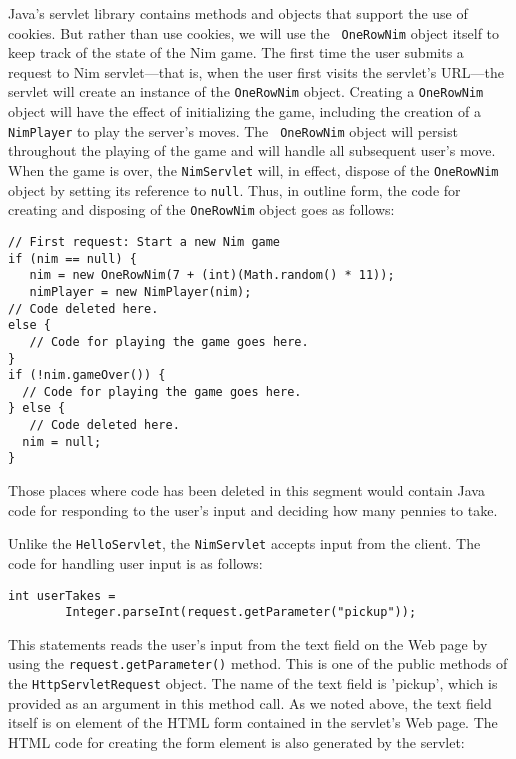 Java's servlet library contains methods and objects that support the
use of cookies. But rather than use cookies, we will use the {\tt
OneRowNim} object itself to keep track of the state of the Nim game.
The first time the user submits a request to Nim servlet---that is,
when the user first visits the servlet's URL---the servlet will create
an instance of the {\tt OneRowNim} object. Creating a {\tt OneRowNim}
object will have the effect of initializing the game, including the
creation of a {\tt NimPlayer} to play the server's moves.  The {\tt
OneRowNim} object will persist throughout the playing of the game and
will handle all subsequent user's move. When the game is over, the
{\tt NimServlet} will, in effect, dispose of the {\tt OneRowNim}
object by setting its reference to {\tt null}.  Thus, in outline
form, the code for creating and disposing of the {\tt OneRowNim}
object goes as follows:

\begin{jjjlisting}
\begin{lstlisting}
// First request: Start a new Nim game
if (nim == null) { 
   nim = new OneRowNim(7 + (int)(Math.random() * 11));
   nimPlayer = new NimPlayer(nim);
// Code deleted here.
else {
   // Code for playing the game goes here.
}
if (!nim.gameOver()) {
  // Code for playing the game goes here.
} else {
   // Code deleted here.
  nim = null;
}
\end{lstlisting}
\end{jjjlisting}

\noindent Those places where code has been deleted in this segment
would contain Java code for responding to the user's input and
deciding how many pennies to take. 

Unlike the {\tt HelloServlet}, the {\tt NimServlet} accepts input from
the client.  The code for handling user input is as follows:

\begin{jjjlisting}
\begin{lstlisting}
int userTakes = 
        Integer.parseInt(request.getParameter("pickup"));
\end{lstlisting}
\end{jjjlisting}

\noindent This statements reads the user's input from the text field
on the Web page by using the {\tt request.getParameter()} method.
This is one of the public methods of the {\tt HttpServletRequest}
object.  The name of the text field is 'pickup', which is provided as
an argument in this method call.  As we noted above, the text field
itself is on element of the HTML form contained in the servlet's
Web page. The HTML code for creating the form element is also generated
by the servlet:

